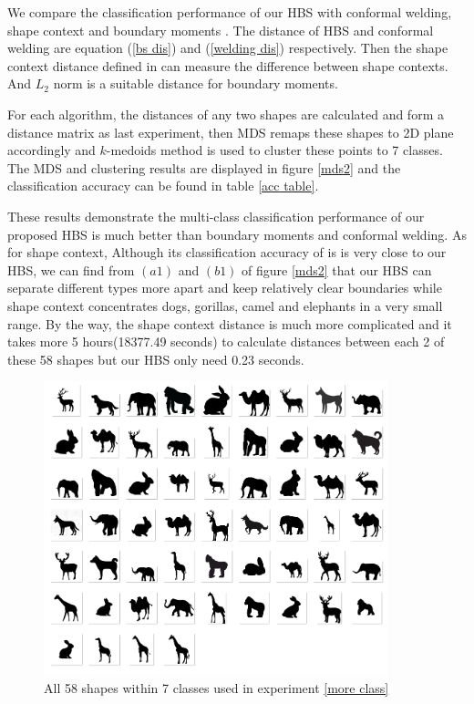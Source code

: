 \documentclass[review,onefignum,onetabnum]{siamonline190516}
\begin{document}
        We compare the classification performance of our HBS with conformal welding, shape context \cite{belongie2002shape} and boundary moments \cite{gupta1987267}. The distance of HBS and conformal welding are equation (\ref{bs dis}) and (\ref{welding dis}) respectively. Then the shape context distance defined in \cite{belongie2006matching} can measure the difference between shape contexts. And $L_2$ norm is a suitable distance for boundary moments.
        
        For each algorithm, the distances of any two shapes are calculated and form a distance matrix as last experiment, then MDS remaps these shapes to 2D plane accordingly and $k$-medoids method is used to cluster these points to 7 classes. The MDS and clustering results are displayed in figure \ref{mds2} and the classification accuracy can be found in table \ref{acc table}.
        
        These results demonstrate the multi-class classification performance of our proposed HBS is much better than boundary moments and conformal welding. As for shape context, Although its classification accuracy of is is very close to our HBS, we can find from $(a1)$ and $(b1)$ of figure \ref{mds2} that our HBS can separate different types more apart and keep relatively clear boundaries while shape context concentrates dogs, gorillas, camel and elephants in a very small range. By the way, the shape context distance is much more complicated and it takes more 5 hours(18377.49 seconds) to calculate distances between each 2 of these 58 shapes but our HBS only need 0.23 seconds.

        \begin{figure}
            \begin{center}
                \includegraphics[width=10cm]{all_images.png}
            \end{center}
            \caption{All 58 shapes within 7 classes used in experiment \ref{more class}}
            \label{more class all}
        \end{figure}
\end{document}
